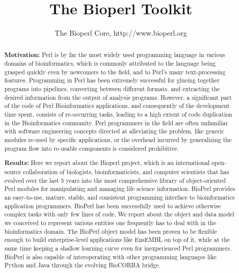 \documentclass{article}
\begin{document}
\begin{twocolumn}
\title{The Bioperl Toolkit}
\author{The Bioperl Core, http://www.bioperl.org }
\maketitle

\begin{abstract}

\textbf{Motivation:} Perl is by far the most widely used programming
language in various domains of bioinformatics, which is commonly
attributed to the language being grasped quickly even by newcomers to
the field, and to Perl's many text-processing features.  Programming in
Perl has been extremely successful for glueing together programs into
pipelines, converting between different formats, and extracting the
desired information from the output of analysis programs.  However, a
significant part of the code of Perl Bioinformatics applications, and
consequently of the development time spent, consists of re-occurring
tasks, leading to a high extent of code duplication in the
Bioinformatics community.  Perl programmers in the field are often
unfamiliar with software engineering concepts directed at alleviating
the problem, like generic modules re-used by specific applications, or
the overhead incurred by generalizing the program flow into re-usable
components is considered prohibitive.

\textbf{ Results:} Here we report about the Bioperl project, which is
an international open-source collaboration of biologists,
bioinformaticists, and computer scientists that has evolved over the
last 5 years into the most comprehensive library of object-oriented
Perl modules for manipulating and managing life science information.
BioPerl provides an easy-to-use, mature, stable, and consistent
programming interface to bioinformatics application programmers.
BioPerl has been successfully used to achieve otherwise complex tasks
with only few lines of code.  We report about the object and data
model we conceived to represent various entities one frequently has to
deal with in the bioinformatics domain.  The BioPerl object model has
been proven to be flexible enough to build enterprise-level
applications like EnsEMBL \cite{ensembl} on top of it, while at the
same time keeping a shallow learning curve even for inexperienced Perl
programmers.  BioPerl is also capable of interoperating with other
programming languages like Python and Java through the evolving
BioCORBA bridge.


\end{abstract}
\end{twocolumn}
\end{document}
